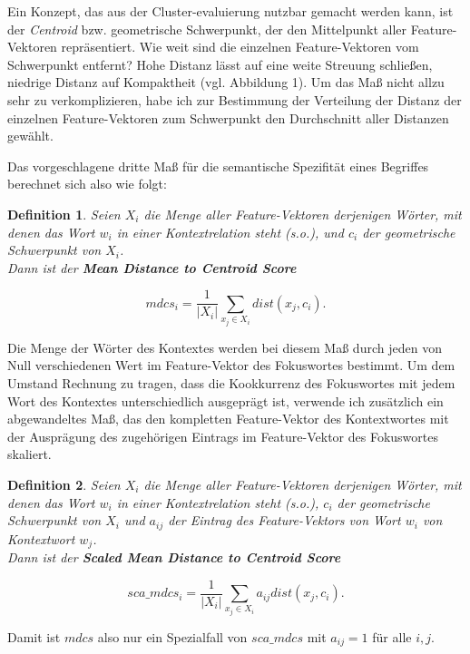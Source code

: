 \documentclass[11pt,numbers=noenddot]{scrartcl}
\newtheorem*{defi}{Definition}
\begin{document}
Ein Konzept, das aus der Cluster-evaluierung nutzbar gemacht werden kann, ist der \emph{Centroid} bzw. geometrische Schwerpunkt, der den Mittelpunkt aller Feature-Vektoren repräsentiert. Wie weit sind die einzelnen Feature-Vektoren vom Schwerpunkt entfernt? Hohe Distanz lässt auf eine weite Streuung schließen, niedrige Distanz auf Kompaktheit (vgl. Abbildung 1). Um das Maß nicht allzu sehr zu verkomplizieren, habe ich zur Bestimmung der Verteilung der Distanz der einzelnen Feature-Vektoren zum Schwerpunkt den Durchschnitt aller Distanzen gewählt.

Das vorgeschlagene dritte Maß für die semantische Spezifität eines Begriffes berechnet sich also wie folgt:

\begin{defi}
Seien $X_i$ die Menge aller Feature-Vektoren derjenigen Wörter, mit denen das Wort $w_i$ in einer Kontextrelation steht (s.o.), und $c_i$ der geometrische Schwerpunkt von $X_i$. \\ Dann ist der \textbf{Mean Distance to Centroid Score}

\begin{equation}
   mdcs_i =  \frac{1}{|X_i|} \sum_{x_j \in X_i} dist(x_j, c_i).
\end{equation}
\end{defi}

Die Menge der Wörter des Kontextes werden bei diesem Maß durch jeden von Null verschiedenen Wert im Feature-Vektor des Fokuswortes bestimmt. Um dem Umstand Rechnung zu tragen, dass die Kookkurrenz des Fokuswortes mit jedem Wort des Kontextes unterschiedlich ausgeprägt ist, verwende ich zusätzlich ein abgewandeltes Maß, das den kompletten Feature-Vektor des Kontextwortes mit der Ausprägung des zugehörigen Eintrags im Feature-Vektor des Fokuswortes skaliert.

\begin{defi}
Seien $X_i$ die Menge aller Feature-Vektoren derjenigen Wörter, mit denen das Wort $w_i$ in einer Kontextrelation steht (s.o.), $c_i$ der geometrische Schwerpunkt von $X_i$ und $a_{ij}$ der Eintrag des Feature-Vektors von Wort $w_i$ von Kontextwort $w_j$. \\ Dann ist der \textbf{Scaled Mean Distance to Centroid Score}

$$
  sca\_mdcs_i =  \frac{1}{|X_i|} \sum_{x_j \in X_i}  a_{ij} dist(x_j, c_i).
$$

\end{defi}

Damit ist $mdcs$ also nur ein Spezialfall von $sca\_mdcs$ mit $a_{ij} = 1$ für alle $i,j$.
\end{document}
